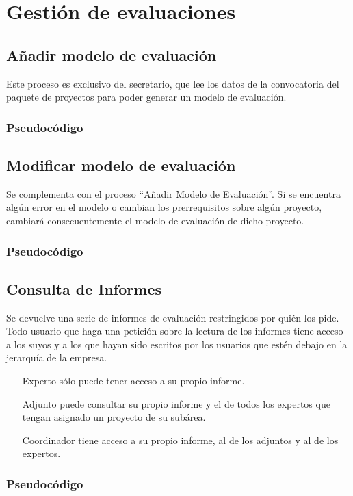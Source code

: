 \documentclass[12pt,a4paper,spanish,twoside]{book}
\begin{document}
\section{Gestión de evaluaciones}

\subsection{Añadir modelo de evaluación}
Este proceso es exclusivo del secretario, que lee los datos de la convocatoria 
del paquete de proyectos para poder generar un modelo de evaluación.

\subsubsection{Pseudocódigo}

\subsection{Modificar modelo de evaluación}
Se complementa con el proceso ``Añadir Modelo de Evaluación''. Si se encuentra 
algún error en el modelo o cambian los prerrequisitos sobre algún proyecto,  
cambiará consecuentemente el modelo de evaluación de dicho proyecto.

\subsubsection{Pseudocódigo}


\subsection{Consulta de Informes}
Se devuelve una serie de informes de evaluación restringidos por quién los pide.
Todo usuario que haga una petición sobre la lectura de los informes tiene 
acceso a los suyos y a los que hayan sido escritos por los usuarios que estén 
debajo en la jerarquía de la empresa.
\begin{itemize}
\item[Experto] sólo puede tener acceso a su propio informe.
\item[Adjunto] puede consultar su propio informe y el de todos los expertos que 
tengan asignado un proyecto de su subárea.
\item[Coordinador] tiene acceso a su propio informe, al de los adjuntos y al de 
los expertos.
\end{itemize}

\subsubsection{Pseudocódigo}
\end{document}
